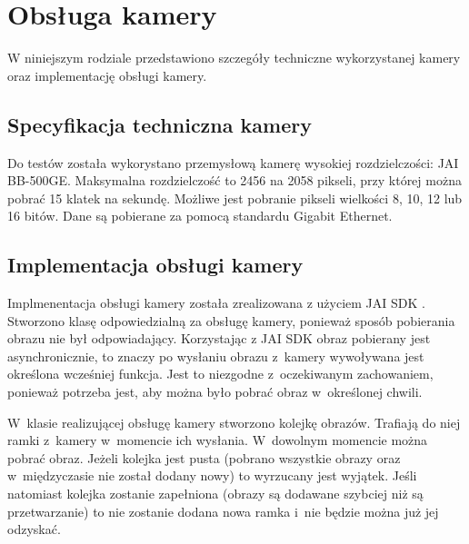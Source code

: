 \chapter{Obsługa kamery}
\label{cha:obslugakamery}

W niniejszym rodziale przedstawiono szczegóły techniczne wykorzystanej kamery oraz implementację obsługi kamery.

\section{Specyfikacja techniczna kamery}
\label{sec:specyfikacjaKamery}

Do testów została wykorystano przemysłową kamerę wysokiej rozdzielczości: JAI BB-500GE. Maksymalna rozdzielczość to 2456 na 2058 pikseli, przy której można pobrać 15 klatek na sekundę. Możliwe jest pobranie pikseli wielkości 8, 10, 12 lub 16 bitów. Dane są pobierane za pomocą standardu Gigabit Ethernet. 

\section{Implementacja obsługi kamery}
\label{sec:implementacjaKamery}

Implmenentacja obsługi kamery została zrealizowana z użyciem JAI SDK \cite{JAISDK}. Stworzono klasę odpowiedzialną za obsługę kamery, ponieważ sposób pobierania obrazu nie był odpowiadający. Korzystając z JAI SDK obraz pobierany jest asynchronicznie, to znaczy po wysłaniu obrazu z~kamery wywoływana jest określona wcześniej funkcja. Jest to niezgodne z~oczekiwanym zachowaniem, ponieważ potrzeba jest, aby można było pobrać obraz w~określonej chwili.

W~klasie realizującej obsługę kamery stworzono kolejkę obrazów. Trafiają do niej ramki z~kamery w~momencie ich wysłania. W~dowolnym momencie można pobrać obraz. Jeżeli kolejka jest pusta (pobrano wszystkie obrazy oraz w~międzyczasie nie został dodany nowy) to wyrzucany jest wyjątek. Jeśli natomiast kolejka zostanie zapełniona (obrazy są dodawane szybciej niż są przetwarzanie) to nie zostanie dodana nowa ramka i~nie będzie można już jej odzyskać.

